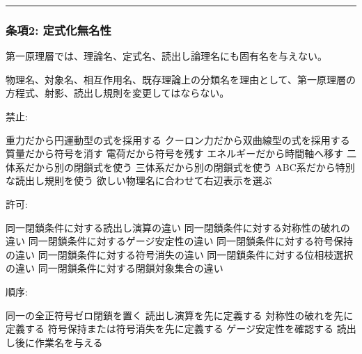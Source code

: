 \documentclass[
  a4paper,
]{ltjsarticle}
\newenvironment{Shaded}{}{}
\newcommand{\NormalTok}[1]{#1}
\begin{document}
\begin{center}\rule{0.5\linewidth}{0.5pt}\end{center}

\subsubsection{条項2:
定式化無名性}\label{ux6761ux98052-ux5b9aux5f0fux5316ux7121ux540dux6027}

第一原理層では、理論名、定式名、読出し論理名にも固有名を与えない。

物理名、対象名、相互作用名、既存理論上の分類名を理由として、第一原理層の方程式、射影、読出し規則を変更してはならない。

禁止:

\begin{Shaded}
\begin{Highlighting}[]
\NormalTok{重力だから円運動型の式を採用する}
\NormalTok{クーロン力だから双曲線型の式を採用する}
\NormalTok{質量だから符号を消す}
\NormalTok{電荷だから符号を残す}
\NormalTok{エネルギーだから時間軸へ移す}
\NormalTok{二体系だから別の閉鎖式を使う}
\NormalTok{三体系だから別の閉鎖式を使う}
\NormalTok{ABC系だから特別な読出し規則を使う}
\NormalTok{欲しい物理名に合わせて右辺表示を選ぶ}
\end{Highlighting}
\end{Shaded}

許可:

\begin{Shaded}
\begin{Highlighting}[]
\NormalTok{同一閉鎖条件に対する読出し演算の違い}
\NormalTok{同一閉鎖条件に対する対称性の破れの違い}
\NormalTok{同一閉鎖条件に対するゲージ安定性の違い}
\NormalTok{同一閉鎖条件に対する符号保持の違い}
\NormalTok{同一閉鎖条件に対する符号消失の違い}
\NormalTok{同一閉鎖条件に対する位相枝選択の違い}
\NormalTok{同一閉鎖条件に対する閉鎖対象集合の違い}
\end{Highlighting}
\end{Shaded}

順序:

\begin{Shaded}
\begin{Highlighting}[]
\NormalTok{同一の全正符号ゼロ閉鎖を置く}
\NormalTok{読出し演算を先に定義する}
\NormalTok{対称性の破れを先に定義する}
\NormalTok{符号保持または符号消失を先に定義する}
\NormalTok{ゲージ安定性を確認する}
\NormalTok{読出し後に作業名を与える}
\end{Highlighting}
\end{Shaded}
\end{document}
